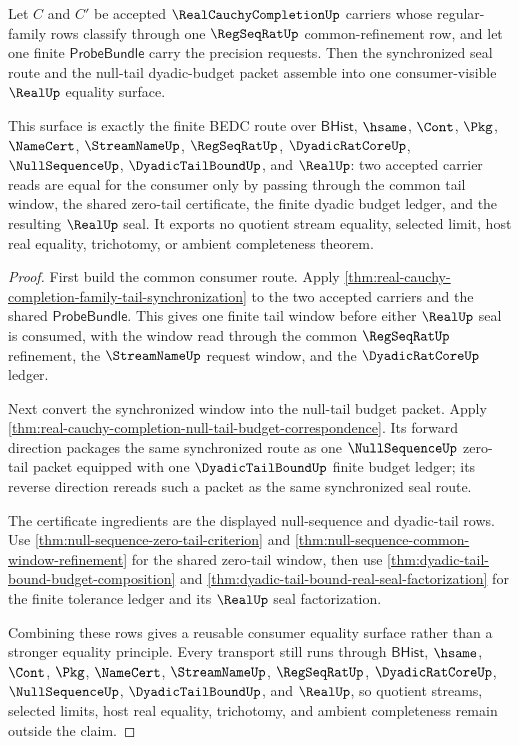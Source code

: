 \begin{theorem}
\label{thm:real-cauchy-completion-synchronized-null-tail-consumer}
Let $C$ and $C'$ be accepted $\RealCauchyCompletionUp$ carriers whose regular-family rows classify through one $\RegSeqRatUp$ common-refinement row, and let one finite $\mathsf{ProbeBundle}$ carry the precision requests. Then the synchronized seal route and the null-tail dyadic-budget packet assemble into one consumer-visible $\RealUp$ equality surface.

This surface is exactly the finite BEDC route over $\mathsf{BHist}$, $\hsame$, $\Cont$, $\Pkg$, $\NameCert$, $\StreamNameUp$, $\RegSeqRatUp$, $\DyadicRatCoreUp$, $\NullSequenceUp$, $\DyadicTailBoundUp$, and $\RealUp$: two accepted carrier reads are equal for the consumer only by passing through the common tail window, the shared zero-tail certificate, the finite dyadic budget ledger, and the resulting $\RealUp$ seal. It exports no quotient stream equality, selected limit, host real equality, trichotomy, or ambient completeness theorem.
\end{theorem}
\begin{proof}
First build the common consumer route. Apply \autoref{thm:real-cauchy-completion-family-tail-synchronization} to the two accepted carriers and the shared $\mathsf{ProbeBundle}$. This gives one finite tail window before either $\RealUp$ seal is consumed, with the window read through the common $\RegSeqRatUp$ refinement, the $\StreamNameUp$ request window, and the $\DyadicRatCoreUp$ ledger.

Next convert the synchronized window into the null-tail budget packet. Apply \autoref{thm:real-cauchy-completion-null-tail-budget-correspondence}. Its forward direction packages the same synchronized route as one $\NullSequenceUp$ zero-tail packet equipped with one $\DyadicTailBoundUp$ finite budget ledger; its reverse direction rereads such a packet as the same synchronized seal route.

The certificate ingredients are the displayed null-sequence and dyadic-tail rows. Use \autoref{thm:null-sequence-zero-tail-criterion} and \autoref{thm:null-sequence-common-window-refinement} for the shared zero-tail window, then use \autoref{thm:dyadic-tail-bound-budget-composition} and \autoref{thm:dyadic-tail-bound-real-seal-factorization} for the finite tolerance ledger and its $\RealUp$ seal factorization.

Combining these rows gives a reusable consumer equality surface rather than a stronger equality principle. Every transport still runs through $\mathsf{BHist}$, $\hsame$, $\Cont$, $\Pkg$, $\NameCert$, $\StreamNameUp$, $\RegSeqRatUp$, $\DyadicRatCoreUp$, $\NullSequenceUp$, $\DyadicTailBoundUp$, and $\RealUp$, so quotient streams, selected limits, host real equality, trichotomy, and ambient completeness remain outside the claim.
\end{proof}

